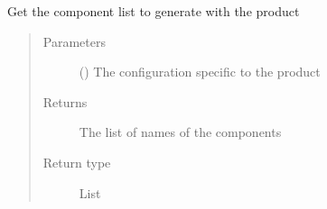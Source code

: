 \documentclass[a4paper,10pt,english]{sphinxmanual}
\begin{document}
\begin{fulllineitems}
\label{\detokenize{commands/apidoc/src:src.product.get_product_components}}
Get the component list to generate with the product
\begin{quote}\begin{description}
\item[{Parameters}] \leavevmode
{} () \textendash{} The configuration specific to 
the product

\item[{Returns}] \leavevmode
The list of names of the components

\item[{Return type}] \leavevmode
List

\end{description}\end{quote}

\end{fulllineitems}

\end{document}
